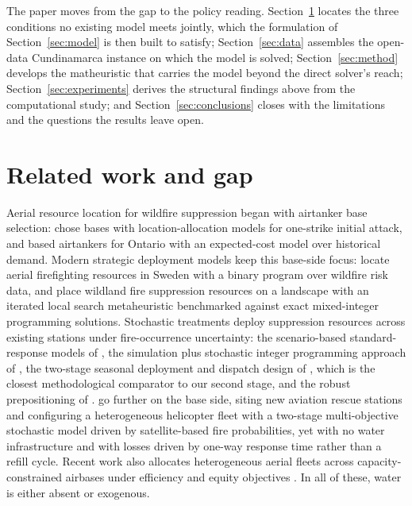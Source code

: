 \documentclass[11pt]{article}
\begin{document}
The paper moves from the gap to the policy reading.
Section~\ref{sec:lit} locates the three conditions no existing model
meets jointly, which the formulation of Section~\ref{sec:model} is
then built to satisfy; Section~\ref{sec:data} assembles the open-data
Cundinamarca instance on which the model is solved;
Section~\ref{sec:method} develops the matheuristic that carries the
model beyond the direct solver's reach; Section~\ref{sec:experiments}
derives the structural findings above from the computational study;
and Section~\ref{sec:conclusions} closes with the limitations and the
questions the results leave open.

\section{Related work and gap}
\label{sec:lit}

Aerial resource location for wildfire suppression began with airtanker
base selection: \citet{hodgson1978} chose bases with location-allocation
models for one-strike initial attack, and \citet{maclellan1996} based
airtankers for Ontario with an expected-cost model over historical
demand. Modern strategic deployment models keep this base-side focus:
\citet{skold2024} locate aerial firefighting resources in Sweden with a
binary program over wildfire risk data, and \citet{mendes2023} place
wildland fire suppression resources on a landscape with an iterated
local search metaheuristic benchmarked against exact mixed-integer
programming solutions. Stochastic treatments deploy
suppression resources across existing stations under fire-occurrence
uncertainty: the scenario-based standard-response models of
\citet{haight2007}, the simulation plus stochastic integer programming
approach of \citet{ntaimo2013}, the two-stage seasonal deployment and
dispatch design of \citet{wei2015}, which is the closest methodological
comparator to our second stage, and the robust prepositioning of
\citet{mendes2025}. \citet{huang2025} go further on the base side,
siting new aviation rescue stations and configuring a heterogeneous
helicopter fleet with a two-stage multi-objective stochastic model
driven by satellite-based fire probabilities, yet with no water
infrastructure and with losses driven by one-way response time rather
than a refill cycle. Recent work also allocates heterogeneous aerial
fleets across capacity-constrained airbases under efficiency and equity
objectives \citep{tasias2026}. In all of these, water is either absent
or exogenous.
\end{document}
